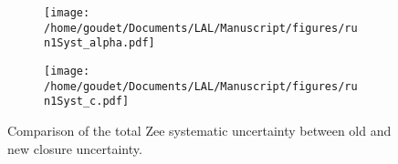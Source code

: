 \begin{enumerate}
\begin{figure}
\begin{subfigure}[t]{0.49\linewidth}
\begin{center}
\texttt{[image: /home/goudet/Documents/LAL/Manuscript/figures/run1Syst\_alpha.pdf]}
\end{center}
\end{subfigure}
\begin{subfigure}[t]{0.49\linewidth}
\begin{center}
\texttt{[image: /home/goudet/Documents/LAL/Manuscript/figures/run1Syst\_c.pdf]}
\end{center}
\end{subfigure}
\caption{\label{org628a64a}
Comparison of the total Zee systematic uncertainty between old and new closure uncertainty. \cite{170712_Guerguichon}}
\end{figure}

\end{enumerate}
